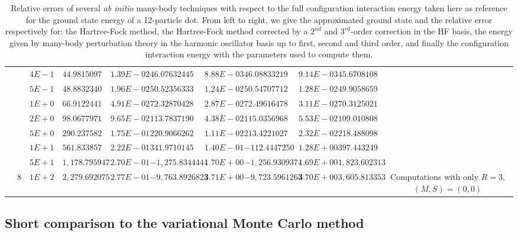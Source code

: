 \begin{landscape}
\begin{table}[ht]
{\begin{tabular}[c]{c|c|c|c|c|c|c|c|c|c|c}
& &$4E-1$ & $44.981509722895$ & $1.39E-02$ & $46.076324456775$ & $8.88E-03$ & $46.088332192345$ & $9.14E-03$ & $45.670810879121$ & \\
& &$5E-1$ & $48.883234063775$ & $1.96E-02$ & $50.523563333035$ & $1.24E-02$ & $50.547077125322$ & $1.28E-02$ & $49.905865978617$ & \\
& &$1E+0$ & $66.912244170015$ & $4.91E-02$ & $72.328704286727$ & $2.87E-02$ & $72.496164786560$ & $3.11E-02$ & $70.312502175757$ & \\
& &$2E+0$ & $98.067797155616$ & $9.65E-02$ & $113.783719056084$ & $4.38E-02$ & $115.035696867396$ & $5.53E-02$ & $109.010808418516$ & \\
& &$5E+0$ & $290.237582802627$ & $1.75E-01$ & $220.906626259943$ & $1.11E-02$ & $213.422102724219$ & $2.32E-02$ & $218.488098056035$ & \\
& &$1E+1$ & $561.833857484633$ & $2.22E-01$ & $341.971014585657$ & $1.40E-01$ & $-112.444725095687$ & $1.28E+00$ & $397.443249829703$ & \\
& &$5E+1$ & $1,178.795947280830$ & $2.70E-01$ & $-1,275.834444440860$ & $1.70E+00$ & $-1,256.930937457310$ & $1.69E+00$ & $1,823.602313382110$ & \\
& \multirow{-23}{*}{8} &$1E+2$ & $2,279.692075613080$ & $2.77E-01$ & $-9,763.892682304570$ & $3.71E+00$ & $-9,723.596126393260$ & $3.70E+00$ & $3,605.813353473020$ & \multirow{-23}{3cm}{Computations with only $R=3$, $(M,S)=(0,0)$}  \\ 
\toprule[1pt]
\end{tabular}
}
 \caption{Relative errors of several \textit{ab initio} many-body techniques with respect to the full configuration interaction energy taken here as reference for the ground state energy of a 12-particle dot. From left to right, we give the approximated ground state and the relative error respectively for: the Hartree-Fock method, the Hartree-Fock method corrected by a $2^{nd}$ and $3^{rd}$-order correction in the HF basis, the energy given by many-body perturbation theory in the harmonic oscillator basis up to first, second and third order, and finally the configuration interaction energy with the parameters used to compute them.}
\label{tab:comparisonMethods12ePT} 
\end{table} 
\end{landscape}



\subsection{Short comparison to the variational Monte Carlo method}

